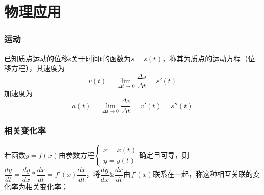 
\chapter{物理应用}

\subsection{运动}
已知质点运动的位移s关于时间t的函数为\(s = s(t)\)，称其为质点的运动方程（位移方程），其速度为\[v(t) = \lim_{\Delta t \to 0}\dfrac{\Delta s}{\Delta t} = s'(t)\]
加速度为\[a(t) = \lim_{\Delta t \to 0}\dfrac{\Delta v}{\Delta t} = v'(t) = s''(t)\]

\subsection{相关变化率}
若函数\(y = f(x)\)由参数方程\(\begin{cases}
    x = x(t) \\ 
    y = y(t)
\end{cases}\)确定且可导，则\(\dfrac{dy}{dt} = \dfrac{dy}{dx} * \dfrac{dx}{dt} = f'(x)\dfrac{dx}{dt}\)，将\(\dfrac{dy}{dx} \&\dfrac{dx}{dt}\)由\(f'(x)\)联系在一起，称这种相互关联的变化率为相关变化率；

